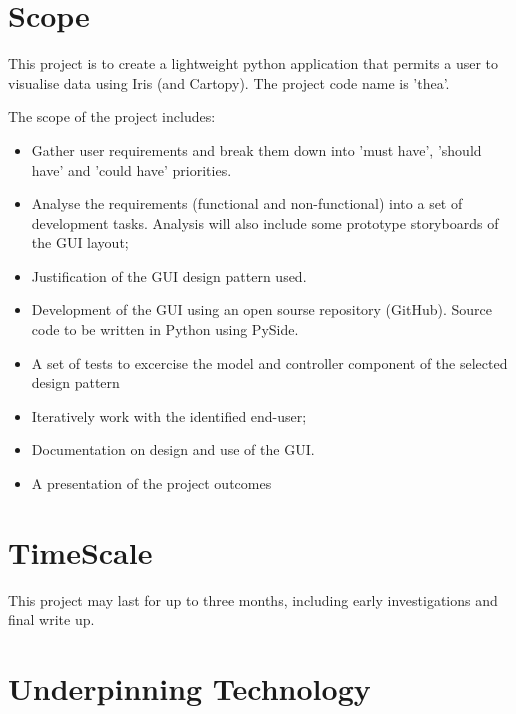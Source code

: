 \documentclass[whitecover]{MO_report}
\begin{document}
\section{Scope}

This project is to create a lightweight python application that permits a user
to visualise data using Iris (and Cartopy). The project code name is 'thea'.

\vspace{4mm}

The scope of the project includes:

\begin{itemize}

\item
Gather user requirements and break them down into 'must have', 'should have'
and 'could have' priorities.

\item
Analyse the requirements (functional and non-functional) into a set of
development tasks. Analysis will also include some prototype storyboards of
the GUI layout;

\item
Justification of the GUI design pattern used.

\item
Development of the GUI using an open sourse repository (GitHub). Source code to
be written in Python using PySide.

\item
A set of tests to excercise the model and controller component of the selected
design pattern

\item
Iteratively work with the identified end-user;

\item
Documentation on design and use of the GUI.

\item
A presentation of the project outcomes

\end{itemize}

\section{TimeScale}

This project may last for up to three months, including early investigations
and final write up.

\section{Underpinning Technology}
\end{document}
